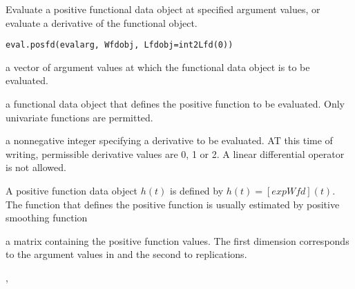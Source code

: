 \documentclass{article}
\begin{document}
\begin{Description}\relax
Evaluate a positive functional data object at specified argument values,
or evaluate a derivative of the functional object.
\end{Description}
\begin{Usage}
\begin{verbatim}
eval.posfd(evalarg, Wfdobj, Lfdobj=int2Lfd(0))
\end{verbatim}
\end{Usage}
\begin{Arguments}
\begin{ldescription}
\item[\code{evalarg}] a vector of argument values at which the functional data object is to be
evaluated.

\item[\code{Wfdobj}] a functional data object that defines the positive function to be
evaluated.  Only univariate functions are permitted.

\item[\code{Lfdobj}] a nonnegative integer specifying a derivative to be evaluated.  AT
this time of writing, permissible derivative values are 0, 1 or 2.
A linear differential operator is not allowed.

\end{ldescription}
\end{Arguments}
\begin{Details}\relax
A positive function data object $h(t)$ is defined by $h(t) =[exp Wfd](t)$.
The function  that defines the positive function is
usually estimated by positive smoothing function
\end{Details}
\begin{Value}
a matrix containing the positive function
values.  The first dimension corresponds to the argument values in
 and
the second to replications.
\end{Value}
\begin{SeeAlso}\relax
{}, 
\end{SeeAlso}
\end{document}
